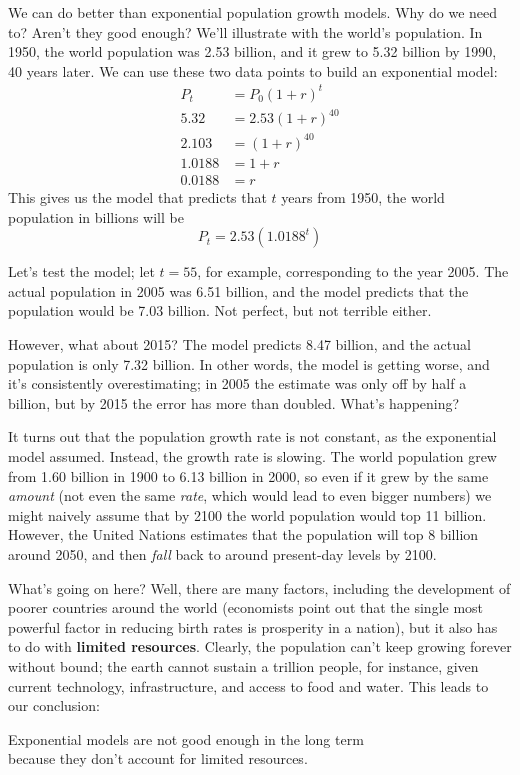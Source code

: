 \setcounter{ExampleCounter}{1}
We can do better than exponential population growth models.  Why do we need to?  Aren't they good enough?  We'll illustrate with the world's population.  In 1950, the world population was 2.53 billion, and it grew to 5.32 billion by 1990, 40 years later.  We can use these two data points to build an exponential model:
\begin{align*}
P_t &= P_0 (1+r)^t\\
5.32 &= 2.53(1+r)^{40}\\
2.103 &= (1+r)^{40}\\
1.0188 &= 1+r\\
0.0188 &= r
\end{align*}
This gives us the model that predicts that $t$ years from 1950, the world population in billions will be \[P_t = 2.53(1.0188^t)\]

Let's test the model; let $t=55$, for example, corresponding to the year 2005.  The actual population in 2005 was 6.51 billion, and the model predicts that the population would be 7.03 billion.  Not perfect, but not terrible either.

However, what about 2015?  The model predicts 8.47 billion, and the actual population is only 7.32 billion.  In other words, the model is getting worse, and it's consistently overestimating; in 2005 the estimate was only off by half a billion, but by 2015 the error has more than doubled.  What's happening?

It turns out that the population growth rate is not constant, as the exponential model assumed.  Instead, the growth rate is slowing.  The world population grew from 1.60 billion in 1900 to 6.13 billion in 2000, so even if it grew by the same \textit{amount} (not even the same \textit{rate}, which would lead to even bigger numbers) we might naively assume that by 2100 the world population would top 11 billion.  However, the United Nations estimates that the population will top 8 billion around 2050, and then \textit{fall} back to around present-day levels by 2100.

What's going on here?  Well, there are many factors, including the development of poorer countries around the world (economists point out that the single most powerful factor in reducing birth rates is prosperity in a nation), but it also has to do with \textbf{limited resources}.  Clearly, the population can't keep growing forever without bound; the earth cannot sustain a trillion people, for instance, given current technology, infrastructure, and access to food and water.  This leads to our conclusion:
\begin{center}
Exponential models are not good enough in the long term\\ because they don't account for limited resources.
\end{center}

